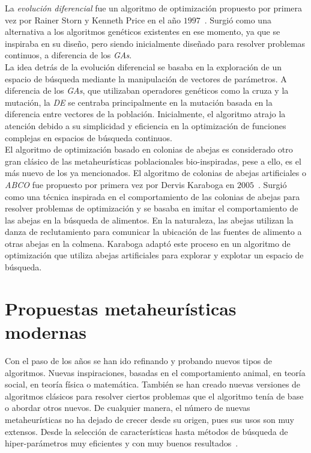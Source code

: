 La \textit{evolución diferencial} fue un algoritmo de optimización propuesto por primera vez por Rainer Storn y Kenneth Price en el año $1997$~\cite{storn_differential_1997}. Surgió como una alternativa a los algoritmos genéticos existentes en ese momento, ya que se inspiraba en su diseño, pero siendo inicialmente diseñado para resolver problemas continuos, a diferencia de los \textit{GAs}.\\[6pt]
La idea detrás de la evolución diferencial se basaba en la exploración de un espacio de búsqueda mediante la manipulación de vectores de parámetros. A diferencia de los \textit{GAs}, que utilizaban operadores genéticos como la cruza y la mutación, la \textit{DE} se centraba principalmente en la mutación basada en la diferencia entre vectores de la población. Inicialmente, el algoritmo atrajo la atención debido a su simplicidad y eficiencia en la optimización de funciones complejas en espacios de búsqueda continuos.\\[6pt]
El algoritmo de optimización basado en colonias de abejas es considerado otro gran clásico de las metaheurísticas poblacionales bio-inspiradas, pese a ello, es el más nuevo de los ya mencionados. El algoritmo de colonias de abejas artificiales o \textit{ABCO} fue propuesto por primera vez por Dervis Karaboga en $2005$~\cite{karaboga_idea_nodate}. Surgió como una técnica inspirada en el comportamiento de las colonias de abejas para resolver problemas de optimización y se basaba en imitar el comportamiento de las abejas en la búsqueda de alimentos. En la naturaleza, las abejas utilizan la danza de reclutamiento para comunicar la ubicación de las fuentes de alimento a otras abejas en la colmena. Karaboga adaptó este proceso en un algoritmo de optimización que utiliza abejas artificiales para explorar y explotar un espacio de búsqueda.

\section{Propuestas metaheurísticas modernas}
Con el paso de los años se han ido refinando y probando nuevos tipos de algoritmos. Nuevas inspiraciones, basadas en el comportamiento animal, en teoría social, en teoría física o matemática. También se han creado nuevas versiones de algoritmos clásicos para resolver ciertos problemas que el algoritmo tenía de base o abordar otros nuevos. De cualquier manera, el número de nuevas metaheurísticas no ha dejado de crecer desde su origen, pues sus usos son muy extensos. Desde la selección de características hasta métodos de búsqueda de hiper-parámetros muy eficientes y con muy buenos resultados~\cite{jaderberg2017population}.

